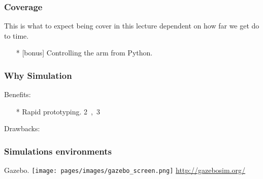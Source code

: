 \begin{frame}
\frametitle{Coverage}
This is what to expect being cover in this lecture dependent on how far we get do to time.
\begin{itemize}
    \item[*] [bonus] Controlling the arm from Python.
\end{itemize}

\end{frame}

\begin{frame}
    \frametitle{Why Simulation}
    Benefits:
    \begin{itemize}
        \item[*] Rapid prototyping. \si{2,3}
    \end{itemize}
    Drawbacks:
    \begin{itemize}
    \end{itemize}

\end{frame}

\begin{frame}
    \frametitle{Simulations environments}
    Gazebo.
    \texttt{[image: pages/images/gazebo\_screen.png]}
    \url{http://gazebosim.org/}
\end{frame}
